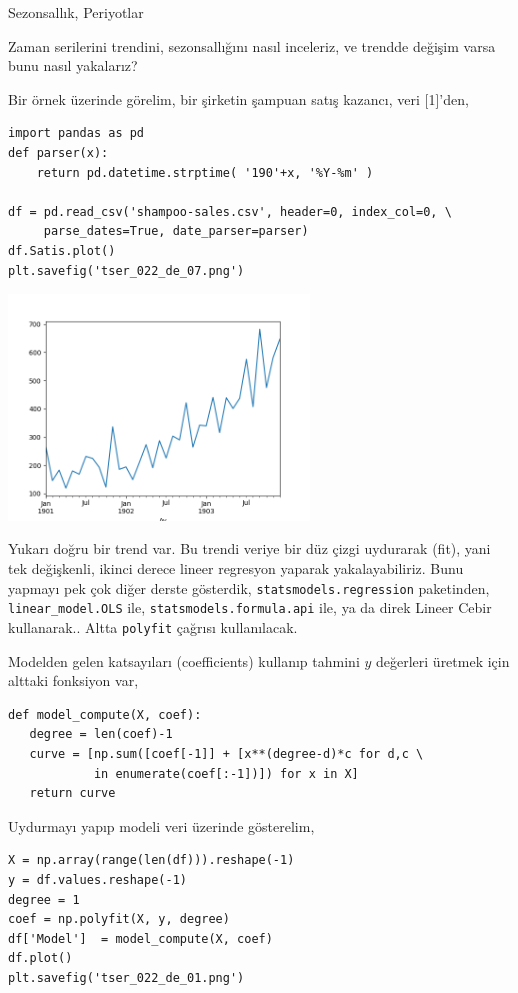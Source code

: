 \documentclass[12pt,fleqn]{article}\usepackage{../../common}
\begin{document}
Sezonsallık, Periyotlar

Zaman serilerini trendini, sezonsallığını nasıl inceleriz, ve trendde değişim
varsa bunu nasıl yakalarız?

Bir örnek üzerinde görelim, bir şirketin şampuan satış kazancı, veri [1]'den,

\begin{verbatim}
import pandas as pd
def parser(x):
    return pd.datetime.strptime( '190'+x, '%Y-%m' )
    
df = pd.read_csv('shampoo-sales.csv', header=0, index_col=0, \
     parse_dates=True, date_parser=parser)
df.Satis.plot()
plt.savefig('tser_022_de_07.png')
\end{verbatim}

\includegraphics[height=6cm]{tser_022_de_07.png}

Yukarı doğru bir trend var. Bu trendi veriye bir düz çizgi uydurarak (fit), yani
tek değişkenli, ikinci derece lineer regresyon yaparak yakalayabiliriz. Bunu
yapmayı pek çok diğer derste gösterdik, \verb!statsmodels.regression!
paketinden, \verb!linear_model.OLS! ile, \verb!statsmodels.formula.api! ile,
ya da direk Lineer Cebir kullanarak.. Altta \verb!polyfit!  çağrısı
kullanılacak.

Modelden gelen katsayıları (coefficients) kullanıp tahmini $y$ değerleri üretmek
için alttaki fonksiyon var,

\begin{verbatim}
def model_compute(X, coef):
   degree = len(coef)-1
   curve = [np.sum([coef[-1]] + [x**(degree-d)*c for d,c \
            in enumerate(coef[:-1])]) for x in X]
   return curve
\end{verbatim}

Uydurmayı yapıp modeli veri üzerinde gösterelim,

\begin{verbatim}
X = np.array(range(len(df))).reshape(-1)
y = df.values.reshape(-1)
degree = 1
coef = np.polyfit(X, y, degree)
df['Model']  = model_compute(X, coef)
df.plot()
plt.savefig('tser_022_de_01.png')
\end{verbatim}
\end{document}
